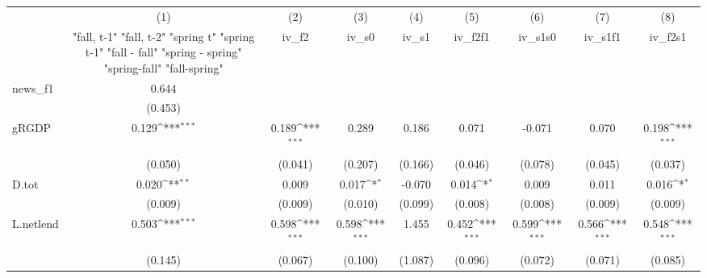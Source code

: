 {
\def\sym#1{\ifmmode^{#1}\else\(^{#1}\)\fi}
\begin{tabular}{l*{8}{c}}
\toprule
            &\multicolumn{1}{c}{(1)}&\multicolumn{1}{c}{(2)}&\multicolumn{1}{c}{(3)}&\multicolumn{1}{c}{(4)}&\multicolumn{1}{c}{(5)}&\multicolumn{1}{c}{(6)}&\multicolumn{1}{c}{(7)}&\multicolumn{1}{c}{(8)}\\
            &\multicolumn{1}{c}{  "fall, t-1" "fall, t-2" "spring t" "spring t-1"  "fall - fall" "spring - spring" "spring-fall" "fall-spring" }&\multicolumn{1}{c}{iv\_f2}&\multicolumn{1}{c}{iv\_s0}&\multicolumn{1}{c}{iv\_s1}&\multicolumn{1}{c}{iv\_f2f1}&\multicolumn{1}{c}{iv\_s1s0}&\multicolumn{1}{c}{iv\_s1f1}&\multicolumn{1}{c}{iv\_f2s1}\\
\midrule
news\_f1     &       0.644         &                     &                     &                     &                     &                     &                     &                     \\
            &     (0.453)         &                     &                     &                     &                     &                     &                     &                     \\
\addlinespace
gRGDP       &       0.129\sym{***}&       0.189\sym{***}&       0.289         &       0.186         &       0.071         &      -0.071         &       0.070         &       0.198\sym{***}\\
            &     (0.050)         &     (0.041)         &     (0.207)         &     (0.166)         &     (0.046)         &     (0.078)         &     (0.045)         &     (0.037)         \\
\addlinespace
D.tot       &       0.020\sym{**} &       0.009         &       0.017\sym{*}  &      -0.070         &       0.014\sym{*}  &       0.009         &       0.011         &       0.016\sym{*}  \\
            &     (0.009)         &     (0.009)         &     (0.010)         &     (0.099)         &     (0.008)         &     (0.008)         &     (0.009)         &     (0.009)         \\
\addlinespace
L.netlend   &       0.503\sym{***}&       0.598\sym{***}&       0.598\sym{***}&       1.455         &       0.452\sym{***}&       0.599\sym{***}&       0.566\sym{***}&       0.548\sym{***}\\
            &     (0.145)         &     (0.067)         &     (0.100)         &     (1.087)         &     (0.096)         &     (0.072)         &     (0.071)         &     (0.085)         \\

\end{tabular}}
